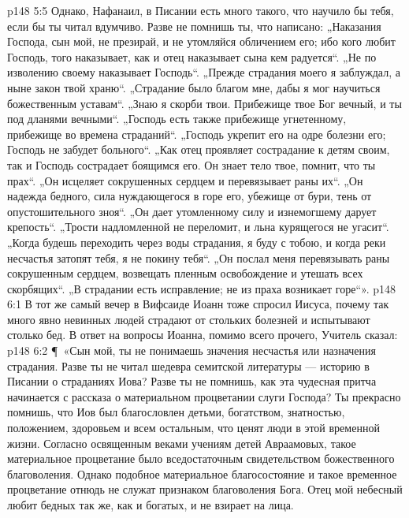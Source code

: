 \vs p148 5:5 Однако, Нафанаил, в Писании есть много такого, что научило бы тебя, если бы ты читал вдумчиво. Разве не помнишь ты, что написано: „Наказания Господа, сын мой, не презирай, и не утомляйся обличением его; ибо кого любит Господь, того наказывает, как и отец наказывает сына кем радуется“. „Не по изволению своему наказывает Господь“. „Прежде страдания моего я заблуждал, а ныне закон твой храню“. „Страдание было благом мне, дабы я мог научиться божественным уставам“. „Знаю я скорби твои. Прибежище твое Бог вечный, и ты под дланями вечными“. „Господь есть также прибежище угнетенному, прибежище во времена страданий“. „Господь укрепит его на одре болезни его; Господь не забудет больного“. „Как отец проявляет сострадание к детям своим, так и Господь сострадает боящимся его. Он знает тело твое, помнит, что ты прах“. „Он исцеляет сокрушенных сердцем и перевязывает раны их“. „Он надежда бедного, сила нуждающегося в горе его, убежище от бури, тень от опустошительного зноя“. „Он дает утомленному силу и изнемогшему дарует крепость“. „Трости надломленной не переломит, и льна курящегося не угасит“. „Когда будешь переходить через воды страдания, я буду с тобою, и когда реки несчастья затопят тебя, я не покину тебя“. „Он послал меня перевязывать раны сокрушенным сердцем, возвещать пленным освобождение и утешать всех скорбящих“. „В страдании есть исправление; не из праха возникает горе“».
\vs p148 6:1 В тот же самый вечер в Вифсаиде Иоанн тоже спросил Иисуса, почему так много явно невинных людей страдают от стольких болезней и испытывают столько бед. В ответ на вопросы Иоанна, помимо всего прочего, Учитель сказал:
\vs p148 6:2 \P\ «Сын мой, ты не понимаешь значения несчастья или назначения страдания. Разве ты не читал шедевра семитской литературы --- историю в Писании о страданиях Иова? Разве ты не помнишь, как эта чудесная притча начинается с рассказа о материальном процветании слуги Господа? Ты прекрасно помнишь, что Иов был благословлен детьми, богатством, знатностью, положением, здоровьем и всем остальным, что ценят люди в этой временной жизни. Согласно освященным веками учениям детей Авраамовых, такое материальное процветание было вседостаточным свидетельством божественного благоволения. Однако подобное материальное благосостояние и такое временное процветание отнюдь не служат признаком благоволения Бога. Отец мой небесный любит бедных так же, как и богатых, и не взирает на лица.
